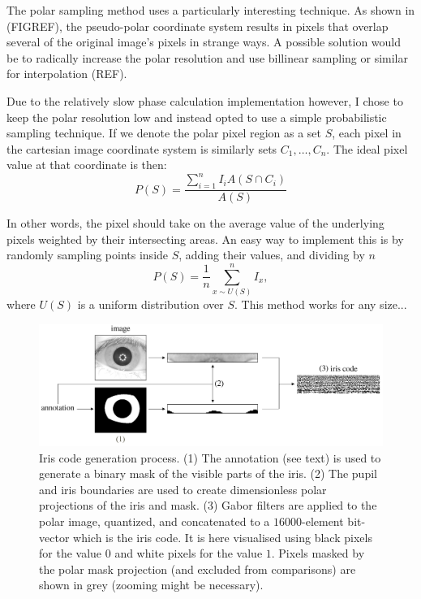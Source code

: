 The polar sampling method uses a particularly interesting technique. As shown in (FIGREF), the pseudo-polar coordinate system results in pixels that overlap several of the original image's pixels in strange ways. A possible solution would be to radically increase the polar resolution and use billinear sampling or similar for interpolation (REF). 

Due to the relatively slow phase calculation implementation however, I chose to keep the polar resolution low and instead opted to use a simple probabilistic sampling technique. If we denote the polar pixel region as a set $S$, each pixel in the cartesian image coordinate system is similarly sets $C_1, \dots, C_n$. The ideal pixel value at that coordinate is then:
\begin{equation}
    P(S) = \frac{\sum_{i=1}^n I_i A(S\cap C_i)}{A(S)}
\end{equation}

In other words, the pixel should take on the average value of the underlying pixels weighted by their intersecting areas. An easy way to implement this is by randomly sampling points inside $S$, adding their values, and dividing by $n$
\begin{equation}
    P(S) = \frac{1}{n}\sum_{x \sim U(S)}^n I_{x},
\end{equation}
where $U(S)$ is a uniform distribution over $S$. This method works for any size...

\begin{figure}
    \centering
    \includegraphics[width=1\linewidth]{figures/iris-code-gen.pdf}
    \caption{Iris code generation process. (1) The annotation (see text) is used to generate a binary mask of the visible parts of the iris. (2) The pupil and iris boundaries are used to create dimensionless polar projections of the iris and mask. (3) Gabor filters are applied to the polar image, quantized, and concatenated to a $16000$-element bit-vector which is the iris code. It is here visualised using black pixels for the value $0$ and white pixels for the value $1$. Pixels masked by the polar mask projection (and excluded from comparisons) are shown in grey (zooming might be necessary). }
    \label{fig:iris-code-gen}
\end{figure}

